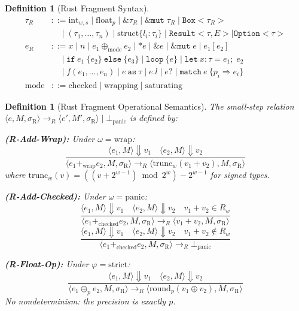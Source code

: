 \documentclass[11pt]{article}
\newtheorem{definition}[theorem]{Definition}
\newcommand{\SemConfigR}{\sigma_{\mathrm{R}}}
\newcommand{\trunc}{\mathrm{trunc}}
\newcommand{\Panic}{\bot_{\mathrm{panic}}}
\begin{document}
\begin{definition}[Rust Fragment Syntax]
\label{def:rustsyntax}
\begin{align*}
\tau_R &::= \mathrm{int}_{w,s} \mid \mathrm{float}_p \mid {\&}\tau_R \mid {\&}\texttt{mut}\;\tau_R \mid \texttt{Box}<\tau_R> \\
       &\quad\mid (\tau_1, \ldots, \tau_n) \mid \mathrm{struct}\{l_i : \tau_i\} \mid \texttt{Result}<\tau, E> \mid \texttt{Option}<\tau> \\
e_R &::= x \mid n \mid e_1 \oplus_{\mathrm{mode}} e_2 \mid {*}e \mid {\&}e \mid {\&}\texttt{mut}\;e \mid e_1[e_2] \\
    &\quad\mid \texttt{if}\ e_1\ \{e_2\}\ \texttt{else}\ \{e_3\} \mid \texttt{loop}\ \{e\} \mid \texttt{let}\ x:\tau = e_1;\; e_2 \\
    &\quad\mid f(e_1, \ldots, e_n) \mid e\ \texttt{as}\ \tau \mid e.l \mid e\texttt{?} \mid \texttt{match}\ e\ \{p_i \Rightarrow e_i\} \\
\mathrm{mode} &::= \mathrm{checked} \mid \mathrm{wrapping} \mid \mathrm{saturating}
\end{align*}
\end{definition}

\begin{definition}[Rust Fragment Operational Semantics]
\label{def:rustsemantics}
The small-step relation $\langle e, M, \SemConfigR \rangle \to_R \langle e', M', \SemConfigR \rangle \mid \Panic$ is defined by:

\textbf{(R-Add-Wrap):} Under $\omega = \mathrm{wrap}$:
\[
\frac{\langle e_1, M \rangle \Downarrow v_1 \quad \langle e_2, M \rangle \Downarrow v_2}
     {\langle e_1 +_{\mathrm{wrap}} e_2, M, \SemConfigR \rangle \to_R \langle \trunc_w(v_1 + v_2), M, \SemConfigR \rangle}
\]
where $\trunc_w(v) = ((v + 2^{w-1}) \bmod 2^w) - 2^{w-1}$ for signed types.

\textbf{(R-Add-Checked):} Under $\omega = \mathrm{panic}$:
\[
\frac{\langle e_1, M \rangle \Downarrow v_1 \quad \langle e_2, M \rangle \Downarrow v_2 \quad v_1 + v_2 \in R_w}
     {\langle e_1 +_{\mathrm{checked}} e_2, M, \SemConfigR \rangle \to_R \langle v_1 + v_2, M, \SemConfigR \rangle}
\]
\[
\frac{\langle e_1, M \rangle \Downarrow v_1 \quad \langle e_2, M \rangle \Downarrow v_2 \quad v_1 + v_2 \notin R_w}
     {\langle e_1 +_{\mathrm{checked}} e_2, M, \SemConfigR \rangle \to_R \Panic}
\]

\textbf{(R-Float-Op):} Under $\varphi = \mathrm{strict}$:
\[
\frac{\langle e_1, M \rangle \Downarrow v_1 \quad \langle e_2, M \rangle \Downarrow v_2}
     {\langle e_1 \oplus_p e_2, M, \SemConfigR \rangle \to_R \langle \mathrm{round}_p(v_1 \oplus v_2), M, \SemConfigR \rangle}
\]
No nondeterminism: the precision is exactly $p$.
\end{definition}
\end{document}
